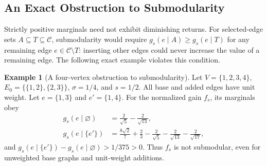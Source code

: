 \documentclass[conference]{IEEEtran}
\theoremstyle{definition}
\newtheorem{example}{Example}
\begin{document}
\subsection{An Exact Obstruction to Submodularity}
Strictly positive marginals need not exhibit diminishing
returns. For selected-edge sets $A\subseteq T\subseteq\mathcal C$,
submodularity would require $g_s(e\mid A)\ge g_s(e\mid T)$
for any remaining edge $e\in\mathcal C\setminus T$: inserting other edges could
never increase the value of a remaining edge. The following
exact example violates this condition.

\begin{example}[A four-vertex obstruction to submodularity]
\label{ex:four-vertex}
Let $V=\{1,2,3,4\}$, $E_0=\{\{1,2\},\{2,3\}\}$, $\sigma=1/4$, and $s=1/2$.
All base and added edges have unit weight. Let $e=\{1,3\}$ and $e'=\{1,4\}$.
For the normalized gain $f_s$, its marginals obey
\begin{align}
 g_s(e\mid\varnothing)&=\frac{2}{\sqrt5}-\frac{2}{\sqrt{13}},\\
 g_s(e\mid\{e'\})&=\frac{8\sqrt2}{7}+\frac23
 -\frac2{\sqrt5}-\frac2{\sqrt{13}}-\frac2{\sqrt{17}},
\end{align}
and $g_s(e\mid\{e'\})-g_s(e\mid\varnothing)>1/375>0$.
Thus $f_s$ is not submodular, even for unweighted base graphs and unit-weight additions.
\end{example}
\end{document}
